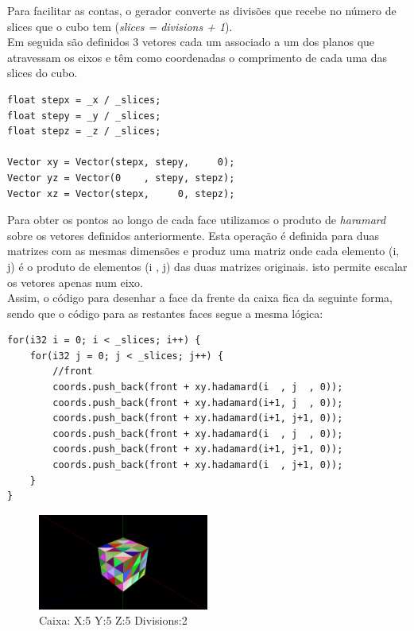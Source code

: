 \documentclass[a4paper]{report}
\begin{document}
Para facilitar as contas, o gerador converte as divisões que recebe no número de
slices que o cubo tem (\textit{slices = divisions + 1}).\\
Em seguida são definidos 3 vetores cada um associado a um dos planos que
atravessam os eixos e têm como coordenadas o comprimento de cada uma das slices
do cubo.\\
\begin{lstlisting}
float stepx = _x / _slices;
float stepy = _y / _slices;
float stepz = _z / _slices;

Vector xy = Vector(stepx, stepy,     0);
Vector yz = Vector(0    , stepy, stepz);
Vector xz = Vector(stepx,     0, stepz);
\end{lstlisting}
Para obter os pontos ao longo de cada face utilizamos o produto de
\textit{haramard} sobre os vetores definidos anteriormente. Esta operação é
definida para duas matrizes com as mesmas dimensões e produz uma matriz onde
cada elemento (i, j) é o produto de elementos (i , j) das duas matrizes
originais. isto permite escalar os vetores apenas num eixo.\\
Assim, o código para desenhar a face da frente da caixa fica da seguinte forma,
sendo que o código para as restantes faces segue a mesma lógica:
\begin{lstlisting}
for(i32 i = 0; i < _slices; i++) {
    for(i32 j = 0; j < _slices; j++) {
        //front
        coords.push_back(front + xy.hadamard(i  , j  , 0));
        coords.push_back(front + xy.hadamard(i+1, j  , 0));
        coords.push_back(front + xy.hadamard(i+1, j+1, 0));
        coords.push_back(front + xy.hadamard(i  , j  , 0));
        coords.push_back(front + xy.hadamard(i+1, j+1, 0));
        coords.push_back(front + xy.hadamard(i  , j+1, 0));
    }
}
\end{lstlisting}

\begin{figure}[H]
    \centering 
    \includegraphics[width=0.5\textwidth]{images/box.png}  
    \caption{Caixa: X:5 Y:5 Z:5 Divisions:2}
    \label{fig:box_render}
\end{figure}
\end{document}
